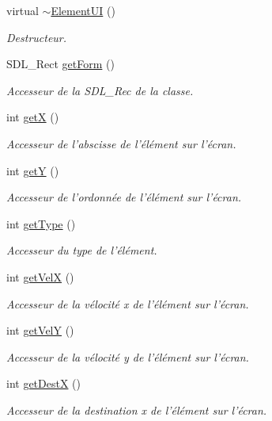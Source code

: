 \begin{DoxyCompactItemize}
virtual \hyperlink{classElementUI_a3185daeef5db6386d4bef3cdad685b60}{$\sim$\-Element\-U\-I} ()
\begin{DoxyCompactList}\small\item\em Destructeur. \end{DoxyCompactList}\item 
S\-D\-L\-\_\-\-Rect \hyperlink{classElementUI_a95985a127a17afb4603bb4a43a571979}{get\-Form} ()
\begin{DoxyCompactList}\small\item\em Accesseur de la S\-D\-L\-\_\-\-Rec de la classe. \end{DoxyCompactList}\item 
int \hyperlink{classElementUI_a4e0d6c8ab7629d20e3d82c163fd616e8}{get\-X} ()
\begin{DoxyCompactList}\small\item\em Accesseur de l'abscisse de l'élément sur l'écran. \end{DoxyCompactList}\item 
int \hyperlink{classElementUI_a2d7985c4848780f45b2050ddd8c19126}{get\-Y} ()
\begin{DoxyCompactList}\small\item\em Accesseur de l'ordonnée de l'élément sur l'écran. \end{DoxyCompactList}\item 
int \hyperlink{classElementUI_ab0fded908da8a103f5f2ec1afff4cd15}{get\-Type} ()
\begin{DoxyCompactList}\small\item\em Accesseur du type de l'élément. \end{DoxyCompactList}\item 
int \hyperlink{classElementUI_a08b1c925bf4f500efadfc703b03dc3d5}{get\-Vel\-X} ()
\begin{DoxyCompactList}\small\item\em Accesseur de la vélocité x de l'élément sur l'écran. \end{DoxyCompactList}\item 
int \hyperlink{classElementUI_a4d7e54c2f05667aff3e8546ea3f30a10}{get\-Vel\-Y} ()
\begin{DoxyCompactList}\small\item\em Accesseur de la vélocité y de l'élément sur l'écran. \end{DoxyCompactList}\item 
int \hyperlink{classElementUI_abd5b1c0ad6bb7ebc50fc33e31fb94f0a}{get\-Dest\-X} ()
\begin{DoxyCompactList}\small\item\em Accesseur de la destination x de l'élément sur l'écran. \end{DoxyCompactList}\item 

\end{DoxyCompactItemize}
